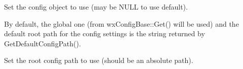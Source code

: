 

\label{wxfontmappersetconfig}


Set the config object to use (may be NULL to use default).

By default, the global one (from wxConfigBase::Get() will be used) 
and the default root path for the config settings is the string returned by
GetDefaultConfigPath().

\label{wxfontmappersetconfigpath}


Set the root config path to use (should be an absolute path).

